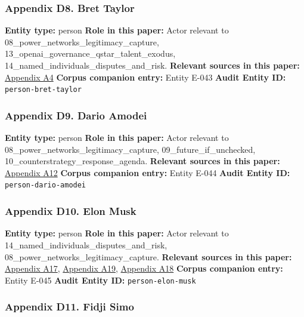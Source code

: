 \documentclass[
  american,
  11pt,
  letterpaper,
]{article}
\begin{document}
\subsubsection{Appendix D8. Bret Taylor}\label{appendix-d8-bret-taylor}

\textbf{Entity type:} person \textbf{Role in this paper:} Actor relevant
to 08\_power\_networks\_legitimacy\_capture,
13\_openai\_governance\_qstar\_talent\_exodus,
14\_named\_individuals\_disputes\_and\_risk. \textbf{Relevant sources in
this paper:}
\hyperref[appendix-a4-openai-announces-new-members-to-board-of-directors]{Appendix
A4} \textbf{Corpus companion entry:} Entity E-043 \textbf{Audit Entity
ID:} \texttt{person-bret-taylor}

\subsubsection{Appendix D9. Dario
Amodei}\label{appendix-d9-dario-amodei}

\textbf{Entity type:} person \textbf{Role in this paper:} Actor relevant
to 08\_power\_networks\_legitimacy\_capture, 09\_future\_if\_unchecked,
10\_counterstrategy\_response\_agenda. \textbf{Relevant sources in this
paper:} \hyperref[appendix-a12-the-adolescence-of-technology]{Appendix
A12} \textbf{Corpus companion entry:} Entity E-044 \textbf{Audit Entity
ID:} \texttt{person-dario-amodei}

\subsubsection{Appendix D10. Elon Musk}\label{appendix-d10-elon-musk}

\textbf{Entity type:} person \textbf{Role in this paper:} Actor relevant
to 14\_named\_individuals\_disputes\_and\_risk,
08\_power\_networks\_legitimacy\_capture. \textbf{Relevant sources in
this paper:}
\hyperref[appendix-a17-musk-v-altman-4-24-cv-04722]{Appendix A17},
\hyperref[appendix-a19-judge-denies-elon-musks-attempt-to-immediately-block-openais-conversion-to-for-profit-entity]{Appendix
A19},
\hyperref[appendix-a18-judge-denies-elon-musk-s-request-to-block-openai-for-profit-conversion-but-welcomes-trial]{Appendix
A18} \textbf{Corpus companion entry:} Entity E-045 \textbf{Audit Entity
ID:} \texttt{person-elon-musk}

\subsubsection{Appendix D11. Fidji Simo}\label{appendix-d11-fidji-simo}
\end{document}
